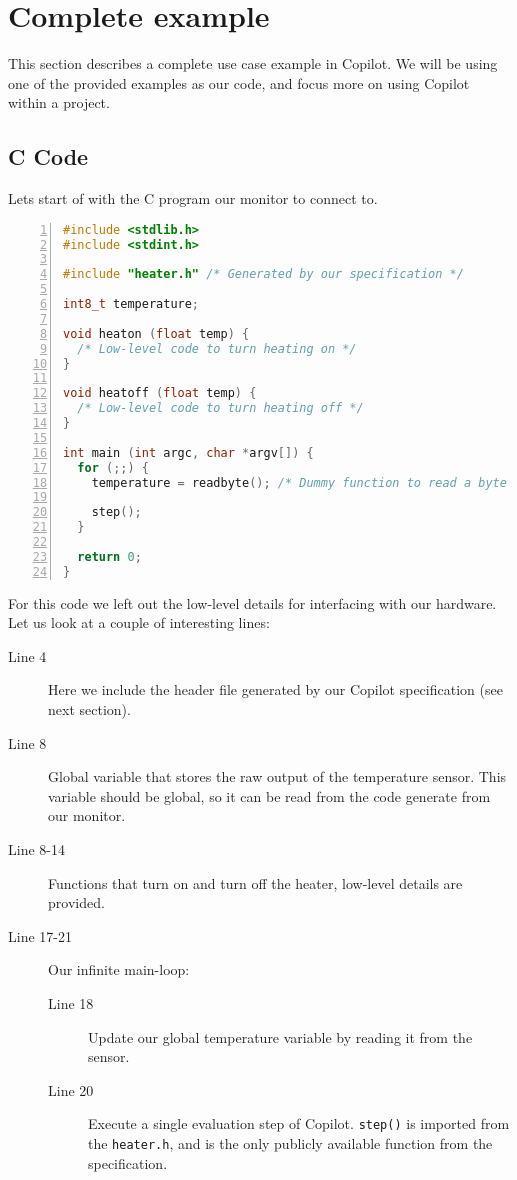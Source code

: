 \section{Complete example}
\label{sec:complete_example}
This section describes a complete use case example in Copilot. We will be using
one of the provided examples as our code, and focus more on using Copilot
within a project.

\subsection{C Code}
Lets start of with the C program our monitor to connect to.
\begin{lstlisting}[language=c, numbers=left]
#include <stdlib.h>
#include <stdint.h>

#include "heater.h" /* Generated by our specification */

int8_t temperature;

void heaton (float temp) {
  /* Low-level code to turn heating on */
}

void heatoff (float temp) {
  /* Low-level code to turn heating off */
}

int main (int argc, char *argv[]) {
  for (;;) {
    temperature = readbyte(); /* Dummy function to read a byte from a sensor. */

    step();
  }

  return 0;
}
\end{lstlisting}

For this code we left out the low-level details for interfacing with our
hardware. Let us look at a couple of interesting lines:

\begin{description}
  \item[Line 4] Here we include the header file generated by our Copilot
  specification (see next section).
  \item[Line 8] Global variable that stores the raw output of the temperature
  sensor. This variable should be global, so it can be read from the code
  generate from our monitor.
  \item[Line 8-14] Functions that turn on and turn off the
  heater, low-level details are provided.
  \item[Line 17-21] Our infinite main-loop:
    \begin{description}
      \item[Line 18] Update our global temperature variable by reading it from
      the sensor.
      \item[Line 20] Execute a single evaluation step of Copilot.
      \texttt{step()} is imported from the \texttt{heater.h}, and is the only
      publicly available function from the specification.
    \end{description}
\end{description}

